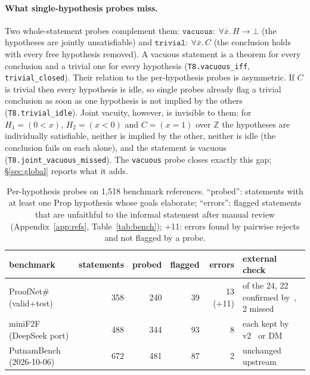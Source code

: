 \documentclass[10pt]{article}
\theoremstyle{definition}
\begin{document}
\paragraph{What single-hypothesis probes miss.} Two whole-statement probes complement them:
$\texttt{vacuous}:\ \forall\bar x.\,H\to\bot$ (the hypotheses are jointly unsatisfiable) and
$\texttt{trivial}:\ \forall\bar x.\,C$ (the conclusion holds with every free hypothesis
removed). A vacuous statement is a theorem for every conclusion and a trivial one for every
hypothesis (\texttt{T8.vacuous\_iff}, \texttt{trivial\_closed}). Their relation to the
per-hypothesis probes is asymmetric. If $C$ is trivial then every hypothesis is idle, so
single probes already flag a trivial conclusion as soon as one hypothesis is not implied by
the others (\texttt{T8.trivial\_idle}). Joint vacuity, however, is invisible to them: for
$H_1=(0<x)$, $H_2=(x<0)$ and $C=(x=1)$ over $\mathbb Z$ the hypotheses are individually
satisfiable, neither is implied by the other, neither is idle (the conclusion fails on each
alone), and the statement is vacuous (\texttt{T8.joint\_vacuous\_missed}). The
\texttt{vacuous} probe closes exactly this gap; \S\ref{sec:global} reports what it adds.

\begin{table}[t]
\centering\small
\begin{tabular}{lrrrrl}
\toprule
benchmark & statements & probed & flagged & errors & external check\\
\midrule
ProofNet\# (valid+test) & 358 & 240 & 39 & 13 (+11) & of the 24, 22 confirmed by~\cite{pnv}, 2 missed\\
miniF2F (DeepSeek port) & 488 & 344 & 93 & 8 & each kept by v2~\cite{minif2fv2} or DM~\cite{minif2fdm}\\
PutnamBench (2026-10-06) & 672 & 481 & 87 & 2 & unchanged upstream\\
\bottomrule
\end{tabular}
\caption{Per-hypothesis probes on 1,518 benchmark references. ``probed'': statements with at
least one Prop hypothesis whose goals elaborate; ``errors'': flagged statements that are
unfaithful to the informal statement after manual review (Appendix~\ref{app:refs},
Table~\ref{tab:bench}); +11: errors found by pairwise rejects and not flagged by a probe.}
\label{tab:audit}
\end{table}
\end{document}
